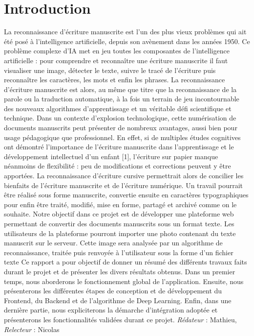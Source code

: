 \documentclass[oneside,a4paper,13pt]{article}
\begin{document}
\section{Introduction}
La reconnaissance d’écriture manuscrite est l’un des plus vieux problèmes qui ait été posé à l’intelligence artificielle, depuis son avènement dans les années 1950. Ce problème complexe d’IA met en jeu toutes les composantes de l’intelligence artificielle : pour comprendre et reconnaître une écriture manuscrite il faut visualiser une image, détecter le texte, suivre le tracé de l’écriture puis reconnaître les caractères, les mots et enfin les phrases. La reconnaissance d’écriture manuscrite est alors, au même que titre que la reconnaissance de la parole ou la traduction automatique, à la fois un terrain de jeu incontournable des nouveaux algorithmes d’apprentissage et un véritable défi scientifique et technique.\bigbreak
Dans un contexte d’explosion technologique, cette numérisation de documents manuscrits peut présenter de nombreux avantages, aussi bien pour usage pédagogique que professionnel. En effet, si de multiples études cognitives ont démontré l’importance de l’écriture manuscrite dans l’apprentissage et le développement intellectuel d’un enfant [1], l’écriture sur papier manque néanmoins de flexibilité : peu de modifications et corrections peuvent y être apportées. La reconnaissance d’écriture cursive permettrait alors de concilier les bienfaits de l’écriture manuscrite et de l’écriture numérique. Un travail pourrait être réalisé sous forme manuscrite, convertie ensuite en caractères typographiques pour enfin être traité, modifié, mise en forme, partagé et archivé comme on le souhaite. \bigbreak
Notre objectif dans ce projet est de développer une plateforme web permettant de convertir des documents manuscrits sous un format texte. Les utilisateurs de la plateforme pourront importer une photo contenant du texte manuscrit sur le serveur. Cette image sera analysée par un algorithme de reconnaissance, traitée puis renvoyée à l'utilisateur sous la forme d’un fichier texte \bigbreak
Ce rapport a pour objectif de donner un résumé des différents travaux faits durant le projet et de présenter les divers résultats obtenus. Dans un premier temps, nous aborderons le fonctionnement global de l’application. Ensuite, nous présenterons les différentes étapes de conception et de développement du Frontend, du Backend et de l’algorithme de Deep Learning. Enfin, dans une dernière partie, nous expliciterons la démarche d’intégration adoptée et présenterons les fonctionnalités validées durant ce projet.
\smallbreak\textit{Rédateur} : Mathieu, \textit{Relecteur} : Nicolas 
\bigskip
\end{document}
